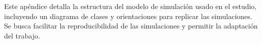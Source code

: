 Este apéndice detalla la estructura del modelo de simulación usado en el estudio, incluyendo un diagrama de clases
y orientaciones para replicar las simulaciones. Se busca facilitar la reproducibilidad de las simulaciones y
permitir la adaptación del trabajo.